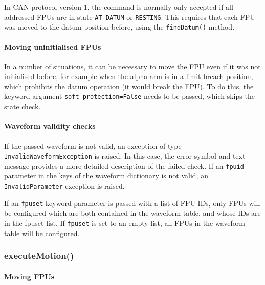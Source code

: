\documentclass[11pt,a4paper]{scrartcl}
\begin{document}
In CAN protocol version 1, the command is normally only accepted if
all addressed FPUs are in state \texttt{AT\_DATUM} or \texttt{RESTING}.
This requires that each FPU was moved to the datum position before, using
the \texttt{findDatum()} method.

\paragraph{Moving uninitialised FPUs}

In a number of situations, it can be necessary to move the FPU even if
it was not initialised before, for example when the alpha arm is in a
limit breach position, which prohibits the datum operation (it would
break the FPU). To do this, the keyword argument
\texttt{soft\_protection=False} needs to be passed, which skips the
state check.


\paragraph{Waveform validity checks}
\begin{sloppypar}
If the passed waveform is not valid, an exception of type
\texttt{InvalidWaveformException} is raised. In this case, the error
symbol and text message provides a more detailed description of the
failed check. If an \texttt{fpuid} parameter in the keys of the waveform dictionary
is not valid, an \texttt{InvalidParameter} exception is raised.
\end{sloppypar}

If an \texttt{fpuset} keyword parameter is passed with a list of FPU
IDs, only FPUs will be configured which are both contained in the
waveform table, and whose IDs are in the fpuset list. If
\texttt{fpuset} is set to an empty list, all FPUs in the waveform
table will be configured.


\subsubsection{executeMotion()}

\paragraph{Moving FPUs}
\end{document}
